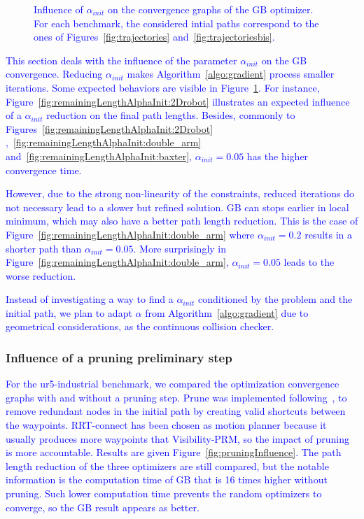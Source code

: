\documentclass{tADR2e}
\begin{document}
\begin{figure}
{		\label{fig:remainingLengthAlphaInit:baxter}
	}
  \caption{\textcolor{blue}{Influence of $\alpha_{init}$ on the convergence graphs of the GB optimizer. For each benchmark, the considered intial paths correspond to the ones of Figures~\ref{fig:trajectories} and~\ref{fig:trajectoriesbis}.}}
  \label{fig:remainingLengthAlphaInit}
\end{figure}

\textcolor{blue}{
This section deals with the influence of the parameter $\alpha_{init}$ on the 
GB convergence. Reducing $\alpha_{init}$ makes Algorithm~\ref{algo:gradient} 
process smaller iterations. Some expected behaviors are visible in 
Figure~\ref{fig:remainingLengthAlphaInit}. 
For instance, Figure~\ref{fig:remainingLengthAlphaInit:2Drobot} illustrates an 
expected influence of a $\alpha_{init}$ reduction on the final path lengths. Besides, commonly to Figures~\ref{fig:remainingLengthAlphaInit:2Drobot}
,~\ref{fig:remainingLengthAlphaInit:double_arm} 
and~\ref{fig:remainingLengthAlphaInit:baxter}, $\alpha_{init}=0.05$ has the higher convergence time.
}

\textcolor{blue}{
However, due to the strong non-linearity of the constraints, reduced iterations 
do not necessary lead to a slower but refined solution. GB can stops earlier 
in local minimum, which may also have a better path length reduction. This is 
the case of Figure~\ref{fig:remainingLengthAlphaInit:double_arm} where $\alpha_{init}=0.2$ results in a shorter path than $\alpha_{init}=0.05$. More surprisingly in Figure~\ref{fig:remainingLengthAlphaInit:double_arm}, $\alpha_{init}=0.05$ leads to the worse reduction.
}

\textcolor{blue}{
Instead of investigating a way to find a $\alpha_{init}$ conditioned by the problem and the initial path, we plan to adapt $\alpha$ from Algorithm~\ref{algo:gradient} due to geometrical considerations, as the continuous collision checker.
}

\subsubsection{Influence of a pruning preliminary step}
\textcolor{blue}{For the ur5-industrial benchmark, we compared the optimization convergence graphs with and without a pruning step. Prune was implemented following~\cite{GeraertsIJRR07}, to remove redundant nodes in the initial path by creating valid shortcuts between the waypoints. RRT-connect has been chosen as motion planner because it usually produces more waypoints that Visibility-PRM, so the impact of pruning is more accountable. Results are given Figure~\ref{fig:pruningInfluence}. The path length reduction of the three optimizers are still compared, but the notable information is the computation time of GB that is 16 times higher without pruning. Such lower computation time prevents the random optimizers to converge, so the GB result appears as better.
}
\end{document}

